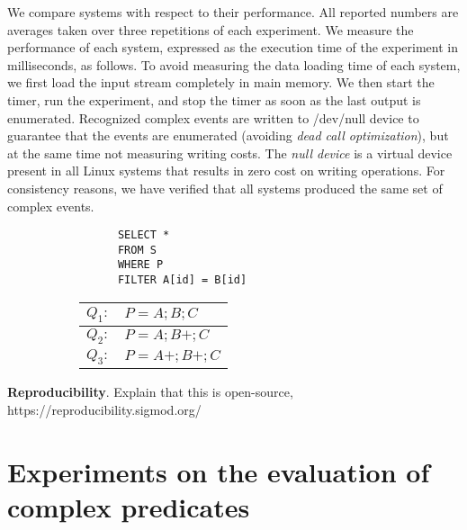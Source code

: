 We compare systems with respect to their performance. All reported numbers are averages taken over three repetitions of each experiment. We measure the performance of each system, expressed as the execution time of the experiment in milliseconds, as follows. To avoid measuring the data loading time of each system, we first load the input stream completely in main memory. We then start the timer, run the experiment, and stop the timer as soon as the last output is enumerated. Recognized complex events are written to /dev/null device to guarantee that the events are enumerated (avoiding \emph{dead call optimization}), but at the same time not measuring writing costs. The \emph{null device} is a virtual device present in all Linux systems that results in zero cost on writing operations. For consistency reasons, we have verified that all systems produced the same set of complex events.



\begin{figure}[H]
  \centering
  \begin{subfigure}[c]{0.49\textwidth}
    \centering
    \begin{verbatim}
      SELECT *
      FROM S
      WHERE P
      FILTER A[id] = B[id]
    \end{verbatim}
  \end{subfigure}
  \begin{subfigure}[t]{0.49\textwidth}
    \begin{tabular}{l l}
      \hline
      $Q_{1}:$ & $P = A;B;C$ \\
      \hline
      $Q_{2}:$ & $P = A;B+;C$ \\
      \hline
      $Q_{3}:$ & $P = A+;B+;C$ \\
      \hline
    \end{tabular}
  \end{subfigure}
\end{figure}


\textbf{Reproducibility}. Explain that this is open-source, https://reproducibility.sigmod.org/



\section{Experiments on the evaluation of complex predicates}\label{sec:predicates}

